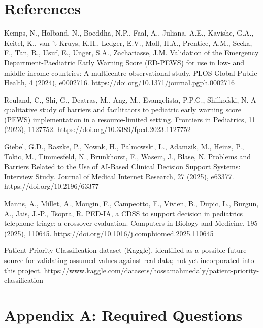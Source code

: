 \documentclass{article}
\begin{document}
\hypertarget{references}{%
\section{References}\label{references}}

Kemps, N., Holband, N., Boeddha, N.P., Faal, A., Juliana, A.E., Kavishe,
G.A., Keitel, K., van 't Kruys, K.H., Ledger, E.V., Moll, H.A.,
Prentice, A.M., Secka, F., Tan, R., Usuf, E., Unger, S.A., Zachariasse,
J.M. Validation of the Emergency Department-Paediatric Early Warning
Score (ED-PEWS) for use in low- and middle-income countries: A
multicentre observational study. PLOS Global Public Health, 4 (2024),
e0002716. https://doi.org/10.1371/journal.pgph.0002716

Reuland, C., Shi, G., Deatras, M., Ang, M., Evangelista, P.P.G.,
Shilkofski, N. A qualitative study of barriers and facilitators to
pediatric early warning score (PEWS) implementation in a
resource-limited setting. Frontiers in Pediatrics, 11 (2023), 1127752.
https://doi.org/10.3389/fped.2023.1127752

Giebel, G.D., Raszke, P., Nowak, H., Palmowski, L., Adamzik, M., Heinz,
P., Tokic, M., Timmesfeld, N., Brunkhorst, F., Wasem, J., Blase, N.
Problems and Barriers Related to the Use of AI-Based Clinical Decision
Support Systems: Interview Study. Journal of Medical Internet Research,
27 (2025), e63377. https://doi.org/10.2196/63377

Manns, A., Millet, A., Mougin, F., Campeotto, F., Vivien, B., Dupic, L.,
Burgun, A., Jais, J.-P., Tsopra, R. PED-IA, a CDSS to support decision
in pediatrics telephone triage: a crossover evaluation. Computers in
Biology and Medicine, 195 (2025), 110645.
https://doi.org/10.1016/j.compbiomed.2025.110645

Patient Priority Classification dataset (Kaggle), identified as a
possible future source for validating assumed values against real data;
not yet incorporated into this project.
https://www.kaggle.com/datasets/hossamahmedaly/patient-priority-classification

\hypertarget{appendix-a-required-questions}{%
\section{Appendix A: Required
Questions}\label{appendix-a-required-questions}}
\end{document}
